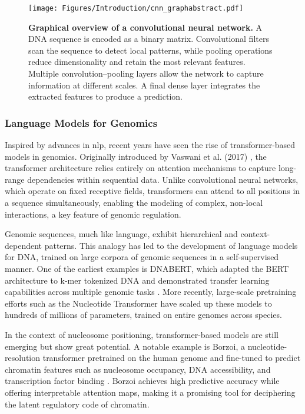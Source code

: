 \documentclass[11pt]{book}
\begin{document}
\begin{figure}[htbp]
    \centering
    \texttt{[image: Figures/Introduction/cnn\_graphabstract.pdf]}
    \caption{\textbf{Graphical overview of a convolutional neural network.}  
    A DNA sequence is encoded as a binary matrix. Convolutional filters scan the sequence to detect local patterns, while pooling operations reduce dimensionality and retain the most relevant features. Multiple convolution–pooling layers allow the network to capture information at different scales. A final dense layer integrates the extracted features to produce a prediction.}
    \label{fig:cnn_graphabstract}
\end{figure}


\subsubsection{Language Models for Genomics}
Inspired by advances in \gls{nlp}, recent years have seen the rise of transformer-based models in genomics. Originally introduced by Vaswani et al. (2017) \cite{vaswani_attention_2023}, the transformer architecture relies entirely on attention mechanisms to capture long-range dependencies within sequential data. Unlike convolutional neural networks, which operate on fixed receptive fields, transformers can attend to all positions in a sequence simultaneously, enabling the modeling of complex, non-local interactions, a key feature of genomic regulation.

Genomic sequences, much like language, exhibit hierarchical and context-dependent patterns. This analogy has led to the development of language models for DNA, trained on large corpora of genomic sequences in a self-supervised manner. One of the earliest examples is DNABERT, which adapted the BERT architecture to k-mer tokenized DNA and demonstrated transfer learning capabilities across multiple genomic tasks \cite{ji_dnabert_2021}. More recently, large-scale pretraining efforts such as the Nucleotide Transformer \cite{dalla-torre_nucleotide_2023} have scaled up these models to hundreds of millions of parameters, trained on entire genomes across species.

In the context of nucleosome positioning, transformer-based models are still emerging but show great potential. A notable example is Borzoi, a nucleotide-resolution transformer pretrained on the human genome and fine-tuned to predict chromatin features such as nucleosome occupancy, DNA accessibility, and transcription factor binding \cite{zhou_borzoi_2024}. Borzoi achieves high predictive accuracy while offering interpretable attention maps, making it a promising tool for deciphering the latent regulatory code of chromatin.
\end{document}
